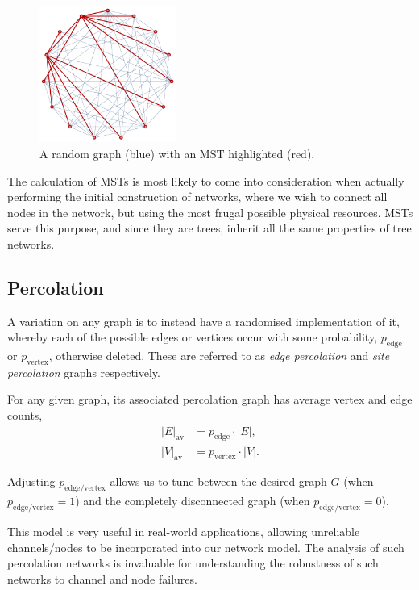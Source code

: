 \begin{figure}[!htbp]
\includegraphics[clip=true, width=0.4\textwidth]{MST}
\captionspacefig \caption{A random graph (blue) with an MST highlighted (red).} \label{fig:mst}
\end{figure}

The calculation of MSTs is most likely to come into consideration when actually performing the initial construction of networks, where we wish to connect all nodes in the network, but using the most frugal possible physical resources. MSTs serve this purpose, and since they are trees, inherit all the same properties of tree networks.

%
%

\subsection{Percolation}\label{sec:perc_topol}

A variation on any graph is to instead have a randomised implementation of it, whereby each of the possible edges or vertices occur with some probability, $p_\mathrm{edge}$ or $p_\mathrm{vertex}$, otherwise deleted. These are referred to as \textit{edge percolation} and \textit{site percolation} graphs respectively.

For any given graph, its associated percolation graph has average vertex and edge counts,
\begin{align}
|E|_\mathrm{av} &= p_\mathrm{edge}\cdot |E|,\nonumber\\
|V|_\mathrm{av} &= p_\mathrm{vertex}\cdot |V|.
\end{align}

Adjusting $p_\mathrm{edge/vertex}$ allows us to tune between the desired graph $G$ (when $p_\mathrm{edge/vertex}=1$) and the completely disconnected graph (when $p_\mathrm{edge/vertex}=0$).

This model is very useful in real-world applications, allowing unreliable channels/nodes to be incorporated into our network model. The analysis of such percolation networks is invaluable for understanding the robustness of such networks to channel and node failures.

